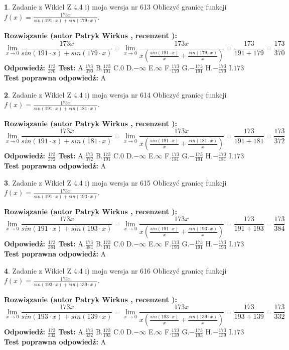 \documentclass[12pt, a4paper]{article}
\theoremstyle{definition} %
\newtheorem{zad}{}
\newcommand{\zadStart}[1]{\begin{zad}#1\newline}
\newcommand{\zadStop}{\end{zad}}
\newcommand{\rozwStart}[2]{\noindent \textbf{Rozwiązanie (autor #1 , recenzent #2): }\newline}
\newcommand{\rozwStop}{\newline}
\newcommand{\odpStart}{\noindent \textbf{Odpowiedź:}\newline}
\newcommand{\odpStop}{\newline}
\newcommand{\testStart}{\noindent \textbf{Test:}\newline}
\newcommand{\testStop}{\newline}
\newcommand{\kluczStart}{\noindent \textbf{Test poprawna odpowiedź:}\newline}
\newcommand{\kluczStop}{\newline}
\begin{document}
\zadStart{Zadanie z Wikieł Z 4.4 i) moja wersja nr 613}
Obliczyć granicę funkcji $f(x)=\frac{173x}{sin(191\cdot x) +sin(179\cdot x)}$.
\zadStop
\rozwStart{Patryk Wirkus}{}
$$\lim\limits_{x\to 0}\frac{173x}{sin(191\cdot x) +sin(179\cdot x)}=\lim\limits_{x\to 0}\frac{173x}{x(\frac{sin(191\cdot x)}{x}+\frac{sin(179\cdot x)}{x})}=\frac{173}{191+179} = \frac{173}{370}$$
\rozwStop
\odpStart
$\frac{173}{370}$
\odpStop
\testStart
A.$\frac{173}{370}$
B.$\frac{173}{191}$
C.$0$
D.$-\infty$
E.$\infty$
F.$\frac{173}{179}$
G.$-\frac{173}{191}$
H.$-\frac{173}{179}$
I.$173$
\testStop
\kluczStart
A
\kluczStop



\zadStart{Zadanie z Wikieł Z 4.4 i) moja wersja nr 614}
Obliczyć granicę funkcji $f(x)=\frac{173x}{sin(191\cdot x) +sin(181\cdot x)}$.
\zadStop
\rozwStart{Patryk Wirkus}{}
$$\lim\limits_{x\to 0}\frac{173x}{sin(191\cdot x) +sin(181\cdot x)}=\lim\limits_{x\to 0}\frac{173x}{x(\frac{sin(191\cdot x)}{x}+\frac{sin(181\cdot x)}{x})}=\frac{173}{191+181} = \frac{173}{372}$$
\rozwStop
\odpStart
$\frac{173}{372}$
\odpStop
\testStart
A.$\frac{173}{372}$
B.$\frac{173}{191}$
C.$0$
D.$-\infty$
E.$\infty$
F.$\frac{173}{181}$
G.$-\frac{173}{191}$
H.$-\frac{173}{181}$
I.$173$
\testStop
\kluczStart
A
\kluczStop



\zadStart{Zadanie z Wikieł Z 4.4 i) moja wersja nr 615}
Obliczyć granicę funkcji $f(x)=\frac{173x}{sin(191\cdot x) +sin(193\cdot x)}$.
\zadStop
\rozwStart{Patryk Wirkus}{}
$$\lim\limits_{x\to 0}\frac{173x}{sin(191\cdot x) +sin(193\cdot x)}=\lim\limits_{x\to 0}\frac{173x}{x(\frac{sin(191\cdot x)}{x}+\frac{sin(193\cdot x)}{x})}=\frac{173}{191+193} = \frac{173}{384}$$
\rozwStop
\odpStart
$\frac{173}{384}$
\odpStop
\testStart
A.$\frac{173}{384}$
B.$\frac{173}{191}$
C.$0$
D.$-\infty$
E.$\infty$
F.$\frac{173}{193}$
G.$-\frac{173}{191}$
H.$-\frac{173}{193}$
I.$173$
\testStop
\kluczStart
A
\kluczStop



\zadStart{Zadanie z Wikieł Z 4.4 i) moja wersja nr 616}
Obliczyć granicę funkcji $f(x)=\frac{173x}{sin(193\cdot x) +sin(139\cdot x)}$.
\zadStop
\rozwStart{Patryk Wirkus}{}
$$\lim\limits_{x\to 0}\frac{173x}{sin(193\cdot x) +sin(139\cdot x)}=\lim\limits_{x\to 0}\frac{173x}{x(\frac{sin(193\cdot x)}{x}+\frac{sin(139\cdot x)}{x})}=\frac{173}{193+139} = \frac{173}{332}$$
\rozwStop
\odpStart
$\frac{173}{332}$
\odpStop
\testStart
A.$\frac{173}{332}$
B.$\frac{173}{193}$
C.$0$
D.$-\infty$
E.$\infty$
F.$\frac{173}{139}$
G.$-\frac{173}{193}$
H.$-\frac{173}{139}$
I.$173$
\testStop
\kluczStart
A
\kluczStop
\end{document}
